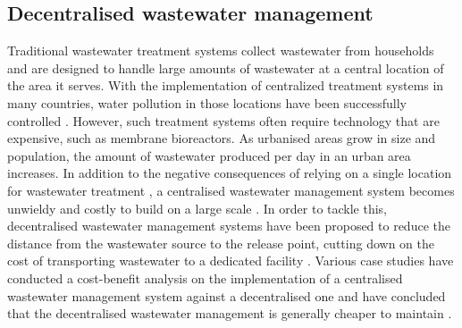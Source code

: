 \documentclass[preprint,12pt,authoryear]{elsarticle}
\begin{document}
\subsection{Decentralised wastewater management}
Traditional wastewater treatment systems collect wastewater from households and are designed to handle large amounts of wastewater at a central location of the area it serves. With the implementation of centralized treatment systems in many countries, water pollution in those locations have been successfully controlled \citep{li2014}. However, such treatment systems often require technology that are expensive, such as membrane bioreactors. As urbanised areas grow in size and population, the amount of wastewater produced per day in an urban area increases. In addition to the negative consequences of relying on a single location for wastewater treatment \citep{wilderer2000,bakir2001}, a centralised wastewater management system becomes unwieldy and costly to build on a large scale \citep{wilderer2000}. In order to tackle this, decentralised wastewater management systems have been proposed to reduce the distance from the wastewater source to the release point, cutting down on the cost of transporting wastewater to a dedicated facility \citep{otterpohl1997,wilderer2000,bakir2001}. Various case studies have conducted a cost-benefit analysis on the implementation of a centralised wastewater management system against a decentralised one and have concluded that the decentralised wastewater management is generally cheaper to maintain \citep{prihandrijanti2008,mawss2015}. 
\end{document}
